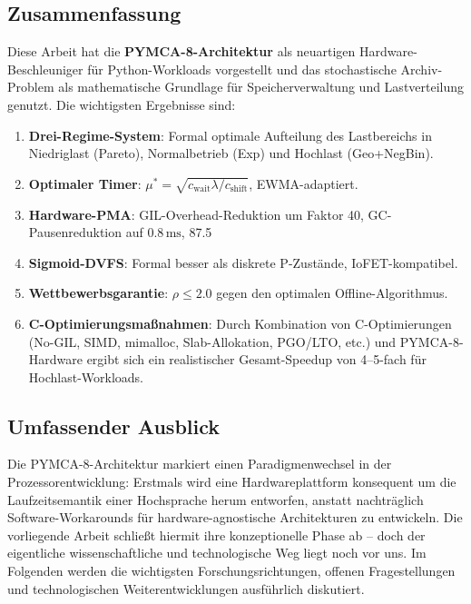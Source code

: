 ﻿\documentclass[a4paper,12pt]{scrreprt}
\theoremstyle{definition}
\begin{document}
	\subsection{Zusammenfassung}
	
	Diese Arbeit hat die \textbf{PYMCA-8-Architektur} als neuartigen Hardware-Beschleuniger für Python-Workloads vorgestellt und das stochastische Archiv-Problem als mathematische Grundlage für Speicherverwaltung und Lastverteilung genutzt. Die wichtigsten Ergebnisse sind:

	\begin{enumerate}[noitemsep]
		\item \textbf{Drei-Regime-System}: Formal optimale Aufteilung des Lastbereichs in Niedriglast (Pareto), Normalbetrieb (Exp) und Hochlast (Geo+NegBin).
		\item \textbf{Optimaler Timer}: $\mu^* = \sqrt{c_{\mathrm{wait}} \lambda / c_{\mathrm{shift}}}$, EWMA-adaptiert.
		\item \textbf{Hardware-PMA}: GIL-Overhead-Reduktion um Faktor 40, GC-Pausenreduktion auf $0.8\,\mathrm{ms}$, 87.5\,%
		\item \textbf{Sigmoid-DVFS}: Formal besser als diskrete P-Zustände, IoFET-kompatibel.
		\item \textbf{Wettbewerbsgarantie}: $\rho \le 2.0$ gegen den optimalen Offline-Algorithmus.
		\item \textbf{C-Optimierungsmaßnahmen}: Durch Kombination von C-Optimierungen (No-GIL, SIMD, mimalloc, Slab-Allokation, PGO/LTO, etc.) und PYMCA-8-Hardware ergibt sich ein realistischer Gesamt-Speedup von 4--5-fach für Hochlast-Workloads.
	\end{enumerate}

	\subsection{Umfassender Ausblick}

	Die PYMCA-8-Architektur markiert einen Paradigmenwechsel in der Prozessorentwicklung:
	Erstmals wird eine Hardwareplattform konsequent um die Laufzeitsemantik einer
	Hochsprache herum entworfen, anstatt nachträglich Software-Workarounds für
	hardware-agnostische Architekturen zu entwickeln. Die vorliegende Arbeit schließt
	hiermit ihre konzeptionelle Phase ab -- doch der eigentliche wissenschaftliche
	und technologische Weg liegt noch vor uns. Im Folgenden werden die wichtigsten
	Forschungsrichtungen, offenen Fragestellungen und technologischen Weiterentwicklungen
	ausführlich diskutiert.
\end{document}
